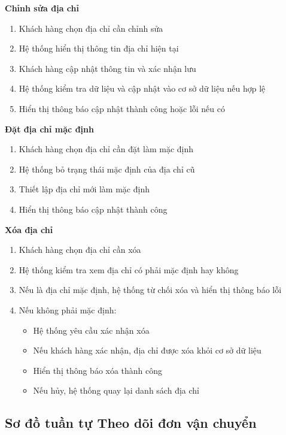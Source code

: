\textbf{Chỉnh sửa địa chỉ}

\begin{enumerate}[noitemsep]
    \item Khách hàng chọn địa chỉ cần chỉnh sửa
    \item Hệ thống hiển thị thông tin địa chỉ hiện tại
    \item Khách hàng cập nhật thông tin và xác nhận lưu
    \item Hệ thống kiểm tra dữ liệu và cập nhật vào cơ sở dữ liệu nếu hợp lệ
    \item Hiển thị thông báo cập nhật thành công hoặc lỗi nếu có
\end{enumerate}

\textbf{Đặt địa chỉ mặc định}

\begin{enumerate}[noitemsep]
    \item Khách hàng chọn địa chỉ cần đặt làm mặc định
    \item Hệ thống bỏ trạng thái mặc định của địa chỉ cũ
    \item Thiết lập địa chỉ mới làm mặc định
    \item Hiển thị thông báo cập nhật thành công
\end{enumerate}

\textbf{Xóa địa chỉ}

\begin{enumerate}[noitemsep]
    \item Khách hàng chọn địa chỉ cần xóa
    \item Hệ thống kiểm tra xem địa chỉ có phải mặc định hay không
    \item Nếu là địa chỉ mặc định, hệ thống từ chối xóa và hiển thị thông báo lỗi
    \item Nếu không phải mặc định:
    \begin{itemize}
        \item Hệ thống yêu cầu xác nhận xóa
        \item Nếu khách hàng xác nhận, địa chỉ được xóa khỏi cơ sở dữ liệu
        \item Hiển thị thông báo xóa thành công
        \item Nếu hủy, hệ thống quay lại danh sách địa chỉ
    \end{itemize}
\end{enumerate}

\subsection{Sơ đồ tuần tự Theo dõi đơn vận chuyển}

